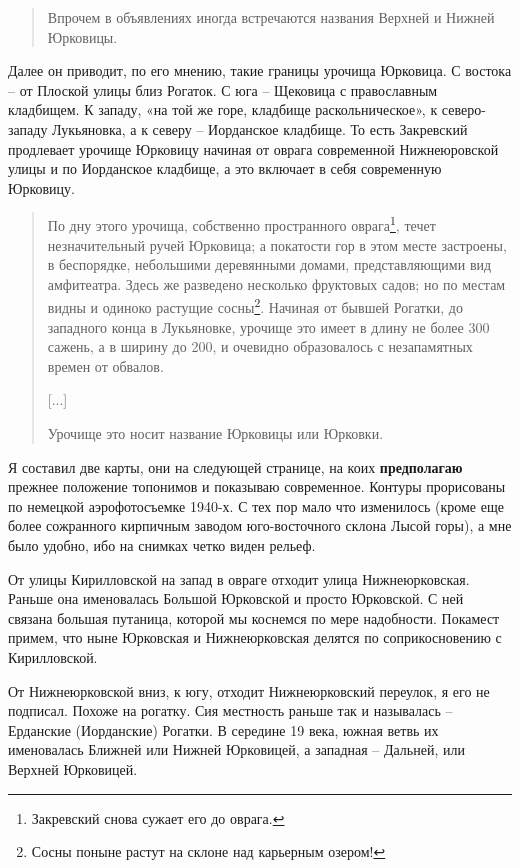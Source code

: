 \begin{quotation}
Впрочем в объявлениях иногда встречаются названия Верхней и Нижней Юрковицы. 
\end{quotation}

Далее он приводит, по его мнению, такие границы урочища Юрковица. С востока – от Плоской улицы близ Рогаток. С юга – Щековица с православным кладбищем. К западу, «на той же горе, кладбище раскольническое», к северо-западу Лукьяновка, а к северу – Иорданское кладбище. То есть Закревский продлевает урочище Юрковицу начиная от оврага современной Нижнеюровской улицы и по Иорданское кладбище, а это включает в себя современную Юрковицу.

\begin{quotation}
По дну этого урочища, собственно пространного оврага\footnote{Закревский снова сужает его до оврага.}, течет незначительный ручей Юрковица; а покатости гор в этом месте застроены, в беспорядке, небольшими деревянными домами, представляющими вид амфитеатра. Здесь же разведено несколько фруктовых садов; но по местам видны и одиноко растущие сосны\footnote{Сосны поныне растут на склоне над карьерным озером!}. Начиная от бывшей Рогатки, до западного конца в Лукьяновке, урочище это имеет в длину не более 300 сажень, а в ширину до 200, и очевидно образовалось с незапамятных времен от обвалов.

[...]

Урочище это носит название Юрковицы или Юрковки.
\end{quotation}

Я составил две карты, они на следующей странице, на коих \textbf{предполагаю} прежнее положение топонимов и показываю современное. Контуры прорисованы по немецкой аэрофотосъемке 1940-х. С тех пор мало что изменилось (кроме еще более сожранного кирпичным заводом юго-восточного склона Лысой горы), а мне было удобно, ибо на снимках четко виден рельеф.

От улицы Кирилловской на запад в овраге отходит улица Нижнеюрковская. Раньше она именовалась Большой Юрковской и просто Юрковской. С ней связана большая путаница, которой мы коснемся по мере надобности. Покамест примем, что ныне Юрковская и Нижнеюрковская делятся по соприкосновению с Кирилловской.

От Нижнеюрковской вниз, к югу, отходит Нижнеюрковский переулок, я его не подписал. Похоже на рогатку. Сия местность раньше так и называлась – Ерданские (Иорданские) Рогатки. В середине 19 века, южная ветвь их именовалась Ближней или Нижней Юрковицей, а западная – Дальней, или Верхней Юрковицей.

